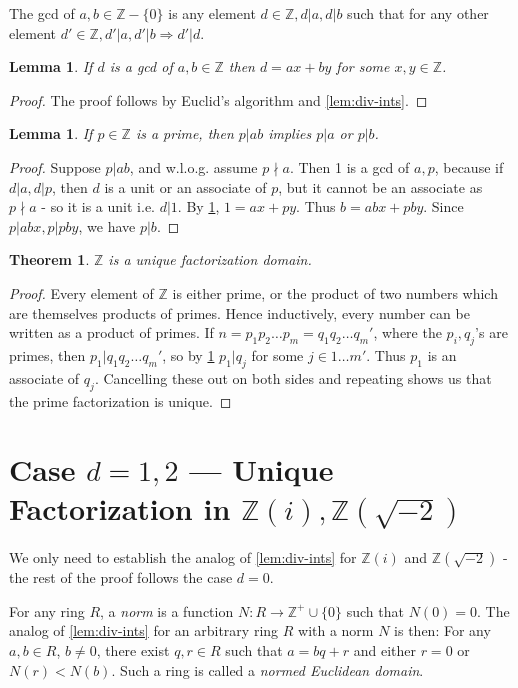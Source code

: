 \documentclass[12pt]{article}
\newcommand{\ints}{{\mathbb{Z}}}
\newtheorem{theorem}[thm]{Theorem}
\newtheorem{lemma}[thm]{Lemma}
\begin{document}
The gcd of $a, b \in \ints - \{0\}$ is any element $d \in \ints, d | a, d | b$ such that for any other element $d' \in \ints, d'|a, d' | b \Rightarrow d' | d$.

\begin{lemma}\label{lem:euclid-ints}
If $d$ is a gcd of $a, b \in  \ints$ then $d = ax + by$ for some $x, y \in \ints$.
\end{lemma}
\begin{proof}
The proof follows by Euclid's algorithm and \cref{lem:div-ints}.
\end{proof}

\begin{lemma}\label{lem:prime-ints}
If $p \in \ints$ is a prime, then $p | ab$ implies $p | a$ or $p | b$.
\end{lemma}
\begin{proof}
Suppose $p | ab$, and w.l.o.g. assume $p \nmid a$. Then 1 is a gcd of $a, p$, because if $d | a, d | p$, then $d$ is a unit or an associate of $p$, but it cannot be an associate as $p \nmid a$ - so it is a unit i.e. $d | 1$. 
By \cref{lem:euclid-ints}, $1 = ax + py$.  Thus $b = abx + pby$. Since $p | abx, p | pby$, we have $p | b$.
\end{proof}

\begin{theorem}
$\ints$ is a unique factorization domain.
\end{theorem}
\begin{proof}
Every element of $\ints$ is either prime, or the product of two numbers which are themselves products of primes. Hence inductively, every number can be written as a product of primes. If $n = p_1 p_2 \ldots p_m = q_1 q_2\ldots q_m'$, where the $p_i, q_j$'s are primes, then $p_1 | q_1 q_2\ldots q_m'$, so by \cref{lem:prime-ints} $p_1 | q_j$ for some $j \in 1\ldots m'$. Thus $p_1$ is an associate of $q_j$. Cancelling these out on both sides and repeating shows us that the prime factorization is unique.
\end{proof}

\section{Case $d = 1, 2$ --- Unique Factorization in $\ints(i), \ints(\sqrt{-2})$}
We only need to establish the analog of \cref{lem:div-ints} for $\ints(i)$ and $\ints(\sqrt{-2})$ - the rest of the proof follows the case $d = 0$. 

For any ring $R$, a {\em norm} is a function $N: R \to \ints^+ \cup \{ 0\}$ such that $N(0) = 0$. The analog of \cref{lem:div-ints} for an arbitrary ring $R$ with a norm $N$ is then:
For any $a, b\in R$, $b \neq 0$, there exist $q, r \in R$ such that $a = bq + r$ and either $r = 0$ or $N(r) < N(b)$. Such a ring is called a {\em normed Euclidean domain}.
\end{document}
